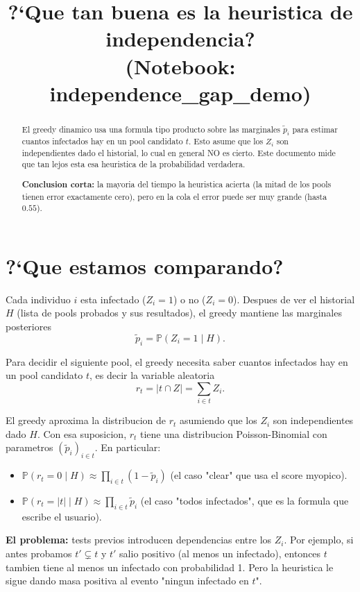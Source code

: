 \documentclass[11pt]{article}
\title{?`Que tan buena es la heuristica de independencia?\\
\large (Notebook: independence\_gap\_demo)}
\author{}
\date{}
\begin{document}
\maketitle

\begin{abstract}
El greedy dinamico usa una formula tipo producto sobre las marginales
$\tilde p_i$ para estimar cuantos infectados hay en un pool candidato
$t$. Esto asume que los $Z_i$ son independientes dado el historial, lo
cual en general NO es cierto. Este documento mide que tan lejos esta
esa heuristica de la probabilidad verdadera.

\textbf{Conclusion corta:} la mayoria del tiempo la heuristica acierta
(la mitad de los pools tienen error exactamente cero), pero en la cola
el error puede ser muy grande (hasta $0.55$).
\end{abstract}

\section{?`Que estamos comparando?}

Cada individuo $i$ esta infectado ($Z_i = 1$) o no ($Z_i = 0$). Despues
de ver el historial $H$ (lista de pools probados y sus resultados),
el greedy mantiene las marginales posteriores
\[
\tilde p_i = \mathbb{P}(Z_i = 1 \mid H).
\]

Para decidir el siguiente pool, el greedy necesita saber cuantos
infectados hay en un pool candidato $t$, es decir la variable aleatoria
\[
r_t = \lvert t \cap Z \rvert = \sum_{i \in t} Z_i.
\]

El greedy aproxima la distribucion de $r_t$ asumiendo que los $Z_i$ son
independientes dado $H$. Con esa suposicion, $r_t$ tiene una distribucion
Poisson-Binomial con parametros $(\tilde p_i)_{i \in t}$. En particular:
\begin{itemize}
  \item $\mathbb{P}(r_t = 0 \mid H) \approx \prod_{i \in t} (1 - \tilde p_i)$
    (el caso "clear" que usa el score myopico).
  \item $\mathbb{P}(r_t = \lvert t \rvert \mid H) \approx \prod_{i \in t} \tilde p_i$
    (el caso "todos infectados", que es la formula que escribe el usuario).
\end{itemize}

\textbf{El problema:} tests previos introducen dependencias entre los
$Z_i$. Por ejemplo, si antes probamos $t' \subsetneq t$ y $t'$ salio
positivo (al menos un infectado), entonces $t$ tambien tiene al menos
un infectado con probabilidad 1. Pero la heuristica le sigue dando masa
positiva al evento "ningun infectado en $t$".
\end{document}
